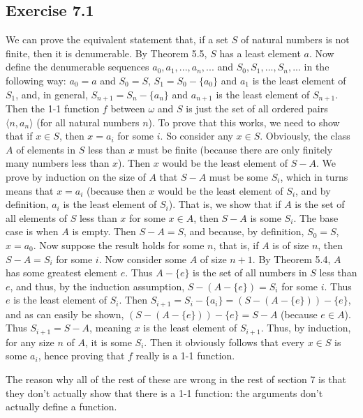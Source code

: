 \documentclass{article}
\theoremstyle{definition}
\begin{document}
\subsection*{Exercise 7.1}
We can prove the equivalent statement that, if a set $S$ of natural numbers is not finite, then it is denumerable. By Theorem 5.5, $S$ has a least element $a$. Now define the 
denumerable sequences $a_0,a_1,...,a_n,...$ and $S_0,S_1,...,S_n,...$ in the following way: $a_0=a$ and $S_0=S$, $S_1=S_0-\{a_0\}$ and $a_1$ is the least element of $S_1$, 
and, in general, 
$S_{n+1}=S_n-\{a_n\}$ and $a_{n+1}$ is the least element of $S_{n+1}$. 
Then the 1-1 function $f$ between $\omega$ and $S$ is just the set of all ordered pairs $\langle n,a_n\rangle$ (for all natural numbers $n$). 
To prove that this works, we need to show that if $x\in S$, then $x=a_i$ for some $i$. So consider any $x\in S$. Obviously, the class $A$ of elements in $S$ less than 
$x$ must be finite (because there are only finitely many numbers less than $x$). Then $x$ would be the least element of $S-A$. We prove by induction on the size of 
$A$ that $S-A$ must be some $S_i$, which in turns means that $x=a_i$ (because then $x$ would be the least element of $S_i$, and by definition, $a_i$ is the least element of 
$S_i$). That is, we show that if $A$ is the set of all elements of $S$ less than $x$ for some $x\in A$, then $S-A$ is some $S_i$. 
The base case is when $A$ is empty. Then $S-A=S$, and because, by definition, $S_0=S$, $x=a_0$. Now suppose the result holds for some $n$, that is, 
if $A$ is of size $n$, then $S-A=S_i$ for some $i$. Now consider some $A$ of size $n+1$. By Theorem 5.4, $A$ has some greatest element $e$. Thus 
$A-\{e\}$ is the set of all numbers in $S$ less than $e$, and thus, by the induction assumption, $S-(A-\{e\})=S_i$ for some $i$. Thus $e$ is the least element of 
$S_i$.
Then $S_{i+1}=S_i-\{a_i\}=(S-(A-\{e\}))-\{e\}$, and as can easily be shown, $(S-(A-\{e\}))-\{e\}=S-A$ (because $e\in A$). Thus $S_{i+1}=S-A$, meaning 
$x$ is the least element of $S_{i+1}$. Thus, by induction, for any size $n$ of $A$, it is some $S_i$. Then it obviously follows that every $x\in S$ is 
some $a_i$, hence proving that $f$ really is a 1-1 function. 


The reason why all of the rest of these  are wrong in the rest of section 7 is that they don't actually show that there is a 1-1 function: the arguments don't actually 
define a function.
\end{document}
